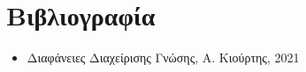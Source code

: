 \section{Βιβλιογραφία}
\label{AppendixA}

\begin{itemize}
  \item Διαφάνειες Διαχείρισης Γνώσης, Α. Κιούρτης, 2021
\end{itemize}